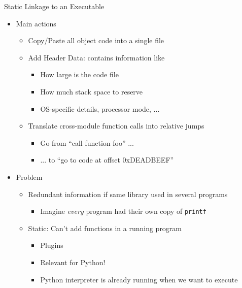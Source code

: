 \begin{frame}{Static Linkage to an Executable}
%
\begin{itemize}
\item Main actions
	\begin{itemize}
	\item Copy/Paste all object code into a single file
	\item Add Header Data: contains information like
		\begin{itemize}
		\item How large is the code file
		\item How much stack space to reserve
		\item OS-specific details, processor mode, ...
		\end{itemize}
	\item Translate cross-module function calls into relative jumps
		\begin{itemize}
		\item Go from \enquote{call function foo} ...
		\item ... to \enquote{go to code at offset 0xDEADBEEF}
		\end{itemize}
	\end{itemize}
\item Problem
	\begin{itemize}
	\item Redundant information if same library used in several programs 
		\begin{itemize}
		\item Imagine \emph{every} program had their own copy of \texttt{printf}
		\end{itemize}
	\item Static: Can't add functions in a running program
		\begin{itemize}
		\item Plugins
		\item Relevant for Python!
		\item Python interpreter is already running when we want to execute 
		\end{itemize}
	\end{itemize}
\end{itemize}
%
\end{frame}


